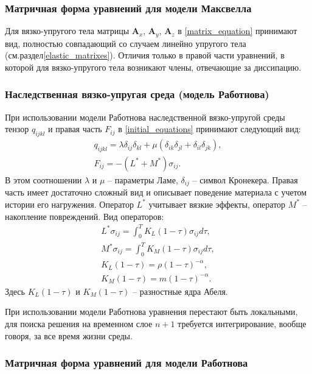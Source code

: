 \subsubsection{Матричная форма уравнений для модели Максвелла}
\label{viscosity_matrixes}

Для вязко-упругого тела матрицы $\mathbf{A}_x$, $\mathbf{A}_y$, $\mathbf{A}_z$ в \ref{matrix_equation} принимают вид, полностью совпадающий со случаем линейно упругого тела (см.раздел\ref{elastic_matrixes}). Отличия только в правой части уравнений, в которой для вязко-упругого тела возникают члены, отвечающие за диссипацию.


\subsubsection{Наследственная вязко-упругая среда (модель Работнова)}

При использовании модели Работнова наследственной вязко-упругой среды тензор $q_{ijkl}$ и правая часть $F_{ij}$ в \ref{initial_equations} принимают следующий вид:
\begin{eqnarray}
\label{tensor_qijkl_rabotnov}
q_{ijkl}=\lambda\delta_{ij}\delta_{kl}+\mu(\delta_{ik}\delta_{jl}+\delta_{il}
\delta_{jk}),\nonumber\\
F_{ij}=-(L^*+M^*)\sigma_{ij}.
\end{eqnarray}
В этом соотношении $\lambda$ и $\mu$ -- параметры Ламе, $\delta_{ij}$ -- символ Кронекера. Правая часть имеет достаточно сложный вид и описывает поведение материала с учетом истории его нагружения. Оператор $L^*$ учитывает вязкие эффекты, оператор $M^*$ -- накопление повреждений. Вид операторов:
\begin{eqnarray}
\label{right_hand_rabotnov}
L^*\sigma_{ij} = \int_0^T{K_L(1-\tau)\sigma_{ij}d\tau}, \nonumber\\
M^*\sigma_{ij} = \int_0^T{K_M(1-\tau)\sigma_{ij}d\tau}, \nonumber\\
K_L(1-\tau)=\rho(1-\tau)^{-\alpha}, \nonumber\\
K_M(1-\tau)=m(1-\tau)^{-\alpha}.
\end{eqnarray}
Здесь $K_L(1-\tau)$ и $K_M(1-\tau)$ -- разностные ядра Абеля.

При использовании модели Работнова уравнения перестают быть локальными, для поиска решения на временном слое $n+1$ требуется интегрирование, вообще говоря, за все время жизни среды.

\subsubsection{Матричная форма уравнений для модели Работнова}
\label{rabotnov_matrixes}

